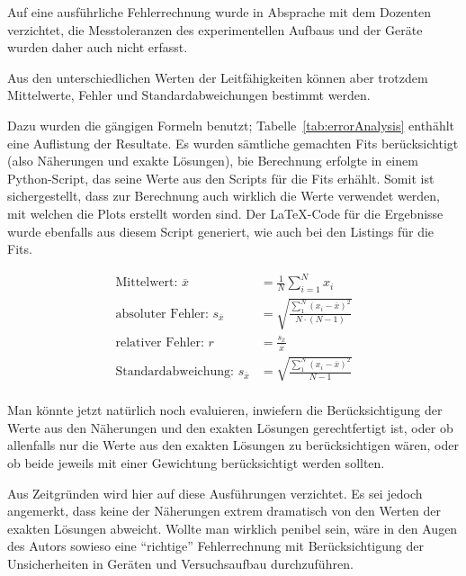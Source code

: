Auf eine  ausf\"uhrliche Fehlerrechnung  wurde in  Absprache mit  dem Dozenten
verzichtet, die  Messtoleranzen des  experimentellen Aufbaus und  der Ger\"ate
wurden daher auch nicht erfasst.

Aus den unterschiedlichen Werten  der Leitf\"ahigkeiten k\"onnen aber trotzdem
Mittelwerte, Fehler und Standardabweichungen bestimmt werden.

Dazu  wurden die  g\"angigen Formeln  benutzt; Tabelle~\ref{tab:errorAnalysis}
enth\"ahlt eine Auflistung der Resultate. Es wurden s\"amtliche gemachten Fits
ber\"ucksichtigt  (also N\"aherungen  und exakte  L\"osungen), bie  Berechnung
erfolgte in  einem Python-Script, das  seine Werte  aus den Scripts  f\"ur die
Fits erh\"ahlt. Somit  ist sichergestellt,  dass zur Berechnung  auch wirklich
die Werte  verwendet werden, mit  welchen die Plots erstellt  worden sind. Der
\LaTeX-Code f\"ur die Ergebnisse wurde  ebenfalls aus diesem Script generiert,
wie auch bei den Listings f\"ur die Fits.

\begin{align*}
    \text{Mittelwert:~}             \overline{x} & = \frac{1}{N} \sum_{i=1}^{N}{x_i} \\
    \text{absoluter Fehler:~}   s_{\overline{x}} & = \sqrt{ \frac{\sum_{1}^{N}{(x_i-\overline{x})^2}}{N \cdot (N-1)}} \\
    \text{relativer Fehler:~}   r                & = \frac{s_{\overline{x}}}{\overline{x}} \\
    \text{Standardabweichung:~} s_{\overline{x}} & = \sqrt{ \frac{\sum_{1}^{N}{(x_i-\overline{x})^2}}{N-1}} \\
\end{align*}



Man   k\"onnte    jetzt   nat\"urlich    noch   evaluieren,    inwiefern   die
Ber\"ucksichtigung der Werte  aus den N\"aherungen und  den exakten L\"osungen
gerechtfertigt  ist,  oder  ob  allenfalls  nur  die  Werte  aus  den  exakten
L\"osungen  zu ber\"ucksichtigen  w\"aren,  oder ob  beide  jeweils mit  einer
Gewichtung  ber\"ucksichtigt  werden   sollten.

Aus  Zeitgr\"unden  wird  hier  auf diese  Ausf\"uhrungen  verzichtet. Es  sei
jedoch  angemerkt,  dass keine  der  N\"aherungen  extrem dramatisch  von  den
Werten  der exakten  L\"osungen  abweicht. Wollte man  wirklich penibel  sein,
w\"are  in  den Augen  des  Autors  sowieso eine  ``richtige''  Fehlerrechnung
mit  Ber\"ucksichtigung der  Unsicherheiten  in  Ger\"aten und  Versuchsaufbau
durchzuf\"uhren.

